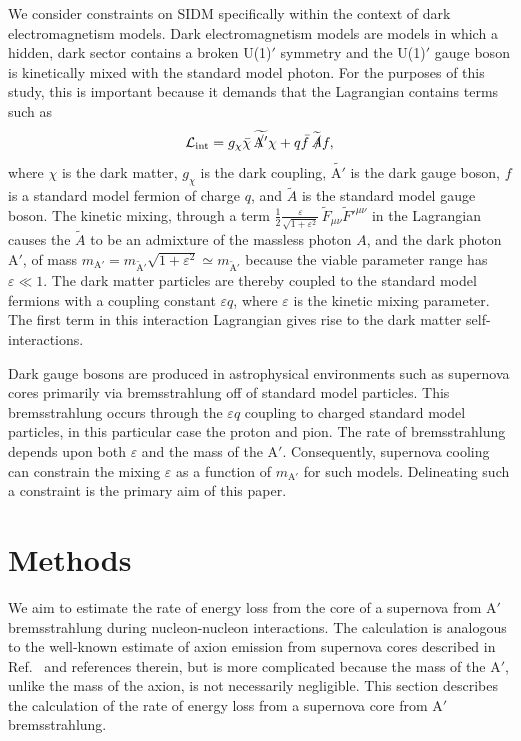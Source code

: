 \documentclass[nofootinbib,prd,superscriptaddress,twocolumn]{revtex4}
\newcommand{\Aprime}{\mathrm{A}'}
\begin{document}
We consider constraints on SIDM specifically within the context of dark electromagnetism models. 
Dark electromagnetism models are models in which a hidden, dark sector contains a broken U(1)$'$ 
symmetry and the U(1)$'$ gauge boson is kinetically mixed with the standard model photon. For the 
purposes of this study, this is important because it demands that the Lagrangian contains terms such as 
%
\begin{equation}
\mathcal{L}_{\mathrm{int}} = g_{\chi} \bar{\chi} \, \widetilde{\slashed{\Aprime}} \chi + q \bar{f}\, \widetilde{\slashed{A}} f, 
\end{equation}
%
where $\chi$ is the dark matter, $g_{\chi}$ is the dark coupling, $\widetilde{\Aprime}$ is the dark gauge boson, 
$f$ is a standard model fermion of charge $q$, and $\widetilde{A}$ is the standard model gauge boson. 
The kinetic mixing, through a term 
$\frac{1}{2}\frac{\varepsilon}{\sqrt{1+\varepsilon^2}}\, \widetilde{F}_{\mu \nu}\widetilde{F}'^{\mu \nu}$ 
in the Lagrangian causes the $\widetilde{A}$ to be an admixture of the massless photon $A$, 
and the dark photon $\Aprime$, 
of mass $m_{\mathrm{\Aprime}} = m_{\mathrm{\widetilde{A}'}} \sqrt{1 + \varepsilon^2} \simeq m_\mathrm{{\widetilde{A}'}}$ because 
the viable parameter range has $\varepsilon \ll 1$. The dark matter particles are thereby coupled 
to the standard model fermions with a coupling constant $\varepsilon q$, 
where $\varepsilon$ is the kinetic mixing parameter. The first term in this 
interaction Lagrangian gives rise to the dark matter self-interactions. 

Dark gauge bosons are produced in astrophysical environments such as supernova 
cores primarily via bremsstrahlung off of standard model particles. This bremsstrahlung 
occurs through the $\varepsilon q$ coupling to charged standard model particles, 
in this  particular case the proton and pion. The rate of bremsstrahlung 
depends upon both $\varepsilon$ and the mass of the $\Aprime$. Consequently, 
supernova cooling can constrain the mixing $\varepsilon$ as a function of 
$m_{\Aprime}$ for such models. Delineating such a constraint is the 
primary aim of this paper.


\section{Methods}
\label{section:computational}
	
We aim to estimate the rate of energy loss from the core of a supernova from $\Aprime$ bremsstrahlung 
during nucleon-nucleon interactions. The calculation is analogous to the well-known estimate of axion 
emission from supernova cores described in Ref.~\cite{raffelt96_book} and references therein, but is 
more complicated because the mass of the $\Aprime$, unlike the mass of the axion, is not necessarily 
negligible. This section describes the calculation of the rate of energy loss from a supernova core 
from $\Aprime$ bremsstrahlung. 
\end{document}
